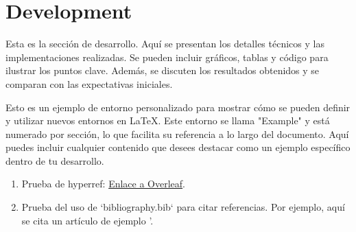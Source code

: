 \documentclass[/work/src/main.tex]{subfiles}
\begin{document}
\section{Development}
Esta es la sección de desarrollo. Aquí se presentan los detalles técnicos y las implementaciones realizadas. Se pueden incluir gráficos, tablas y código para ilustrar los puntos clave. Además, se discuten los resultados obtenidos y se comparan con las expectativas iniciales.

\begin{example} Esto es un ejemplo de entorno personalizado para mostrar cómo se pueden definir y utilizar nuevos entornos en LaTeX. Este entorno se llama "Example" y está numerado por sección, lo que facilita su referencia a lo largo del documento. Aquí puedes incluir cualquier contenido que desees destacar como un ejemplo específico dentro de tu desarrollo.
\end{example}

\begin{enumerate}
    \item Prueba de hyperref: \href{https://www.overleaf.com/learn/latex/Hyperlinks}{Enlace a Overleaf}.
    \item Prueba del uso de `bibliography.bib` para citar referencias. Por ejemplo, aquí se cita un artículo de ejemplo \cite{greenwade93}'.
\end{enumerate}
\end{document}

